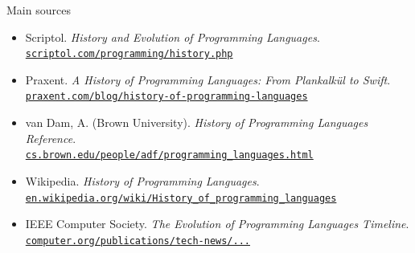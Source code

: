 \documentclass{beamer}
\begin{document}
\begin{frame}{Main sources}
  \begin{itemize}
    \item Scriptol. \textit{History and Evolution of Programming Languages}. \\
      \href{https://www.scriptol.com/programming/history.php}{\texttt{scriptol.com/programming/history.php}}

    \item Praxent. \textit{A History of Programming Languages: From
      Plankalkül to Swift}. \\
      \href{https://praxent.com/blog/history-of-programming-languages}{\texttt{praxent.com/blog/history-of-programming-languages}}

    \item van Dam, A. (Brown University). \textit{History of
      Programming Languages Reference}. \\
      \href{https://cs.brown.edu/people/adf/programming_languages.html}{\texttt{cs.brown.edu/people/adf/programming\_languages.html}}

    \item Wikipedia. \textit{History of Programming Languages}. \\
      \href{https://en.wikipedia.org/wiki/History_of_programming_languages}{\texttt{en.wikipedia.org/wiki/History\_of\_programming\_languages}}

    \item IEEE Computer Society. \textit{The Evolution of Programming
      Languages Timeline}. \\
      \href{https://www.computer.org/publications/tech-news/insider-membership-news/timeline-of-programming-languages}{\texttt{computer.org/publications/tech-news/...}}
  \end{itemize}
\end{frame}
\end{document}
